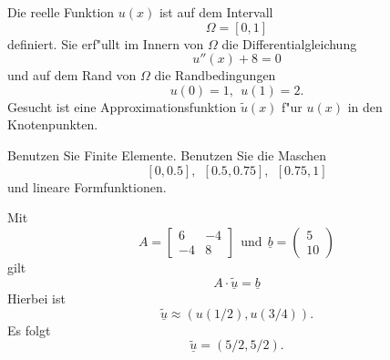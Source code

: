 Die reelle Funktion $u(x)$ ist auf dem Intervall
\[
\Omega = [0, 1]
\]
definiert. Sie erf"ullt im Innern von $\Omega$ die Differentialgleichung 
\[
u''(x) + 8 = 0
\]
und auf dem Rand von $\Omega$ die Randbedingungen 
\[
u(0) = 1, \ \ u(1) = 2.
\]
Gesucht ist eine Approximationsfunktion $\tilde u(x)$ f"ur $u(x)$
in den Knotenpunkten.

\vspace{2mm}

Benutzen Sie Finite Elemente. Benutzen Sie die Maschen
\[
[0,0.5], \ \ [0.5, 0.75], \ \ [0.75, 1]
\]
und lineare Formfunktionen.

\begin{loesung}
Mit
\[
A = \left[\begin{array}{rr} 6 & -4  \\ -4 & 8  \end{array}\right] \ \ \mbox{und} \ \
  \underline{b} =  \left(\begin{array}{r} 5 \\ 10 \end{array}\right)
\]
gilt  
\[
A \cdot \underline{\tilde u} = \underline{b}
\]
Hierbei ist
\[
\underline{\tilde u} \approx (u(1/2), u(3/4)).
\]
Es folgt 
\[
\underline{\tilde u} = (5/2,5/2).
\]
\end{loesung}
